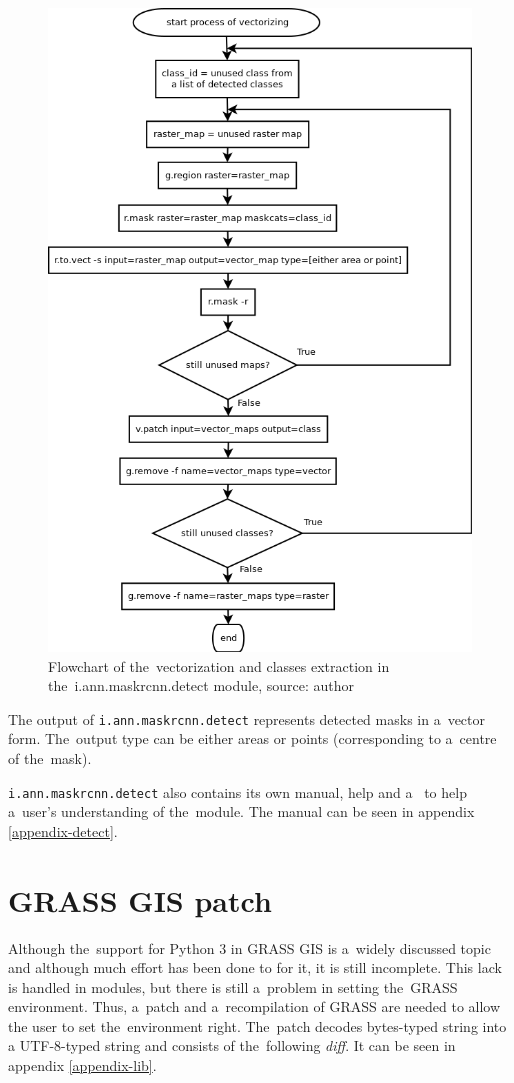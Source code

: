 \begin{figure}[H]
   \centering
	\includegraphics[width=0.7\linewidth]{./pictures/vectorize.png}
	\caption[vectorization in i.ann.maskrcnn.detect flowchart]{Flowchart of the~vectorization and classes extraction in the~i.ann.maskrcnn.detect module, source: author}
      \label{fig:vectorize}
\end{figure}

The output of \verb|i.ann.maskrcnn.detect| represents detected masks in a~vector form. The~output type can be either areas or points (corresponding to a~centre of the~mask).

\verb|i.ann.maskrcnn.detect| also contains its own manual, help and a~ to 
help a~user's understanding of the~module. The
manual can be seen in appendix \ref{appendix-detect}.

\section{GRASS GIS patch}
\label{grass-patch}

Although the~support for Python 3 in GRASS GIS is a~widely discussed topic and
although much effort has been done to for it, it is still incomplete. This
lack is handled in modules, but there is still a~problem in setting the~GRASS
environment. Thus, a~patch and a~recompilation of GRASS are needed to allow the
user to set the~environment right. The~patch decodes bytes-typed string into a
UTF-8-typed string and consists of the~following \textit{diff}. It can be seen
in appendix \ref{appendix-lib}.